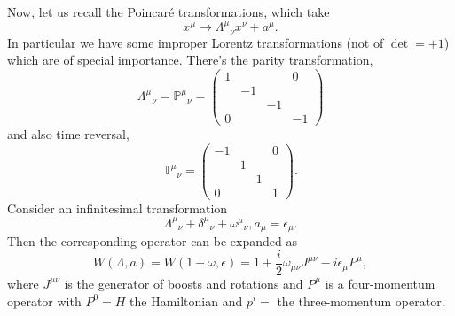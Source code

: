 Now, let us recall the Poincar\'e transformations, which take
\begin{equation}
    x^\mu \to \Lambda^\mu{}_\nu x^\nu + a^\mu.
\end{equation}
In particular we have some improper Lorentz transformations (not of $\det = +1$) which are of special importance. There's the parity transformation,
\begin{equation}
    \Lambda^\mu{}_\nu=\mathbb{P}^\mu{}_\nu = \begin{pmatrix}
        1 &&& 0 \\
        & -1 && \\
        && -1 &\\
        0 &&& -1
    \end{pmatrix}
\end{equation}
and also time reversal,
\begin{equation}
    \mathbb{T}^\mu{}_\nu = \begin{pmatrix}
        -1 &&& 0 \\
        & 1 && \\
        && 1 &\\
        0 &&& 1
    \end{pmatrix}.
\end{equation}
Consider an infinitesimal transformation
\begin{equation}
    \Lambda^\mu{}_\nu + \delta^\mu{}_\nu + \omega^\mu{}_\nu, a_\mu = \epsilon_\mu.
\end{equation}
Then the corresponding operator can be expanded as
\begin{equation}\label{wexpansion}
    W(\Lambda,a) = W(1+\omega, \epsilon) = 1+\frac{i}{2} \omega_{\mu\nu} J^{\mu\nu} -i\epsilon_\mu P^\mu,
\end{equation}
where $J^{\mu\nu}$ is the generator of boosts and rotations and $P^\mu$ is a four-momentum operator with $P^0=H$ the Hamiltonian and $p^i=$ the three-momentum operator.

